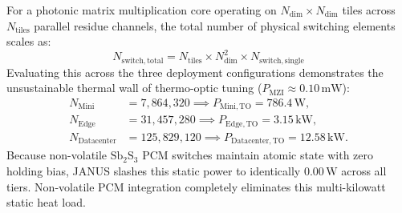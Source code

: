 \documentclass[journal]{IEEEtran}
\begin{document}
For a photonic matrix multiplication core operating on $N_{\mathrm{dim}} \times N_{\mathrm{dim}}$ tiles across $N_{\mathrm{tiles}}$ parallel residue channels, the total number of physical switching elements scales as:
\begin{equation}
N_{\mathrm{switch,total}} = N_{\mathrm{tiles}} \times N_{\mathrm{dim}}^2 \times N_{\mathrm{switch,single}}
\label{eq:total_switches}
\end{equation}
Evaluating this across the three deployment configurations demonstrates the unsustainable thermal wall of thermo-optic tuning ($P_{\mathrm{MZI}} \approx 0.10\,\mathrm{mW}$):
\begin{equation}
\begin{aligned}
N_{\mathrm{Mini}} &= 7{,}864{,}320 \implies P_{\mathrm{Mini,TO}} = 786.4\,\mathrm{W}, \\
N_{\mathrm{Edge}} &= 31{,}457{,}280 \implies P_{\mathrm{Edge,TO}} = 3.15\,\mathrm{kW}, \\
N_{\mathrm{Datacenter}} &= 125{,}829{,}120 \implies P_{\mathrm{Datacenter,TO}} = 12.58\,\mathrm{kW}.
\end{aligned}
\label{eq:mzi_heat_wall}
\end{equation}
Because non-volatile $\mathrm{Sb_2S_3}$ PCM switches maintain atomic state with zero holding bias, JANUS slashes this static power to identically $0.00\,\mathrm{W}$ across all tiers.
Non-volatile PCM integration completely eliminates this multi-kilowatt static heat load.
\end{document}
